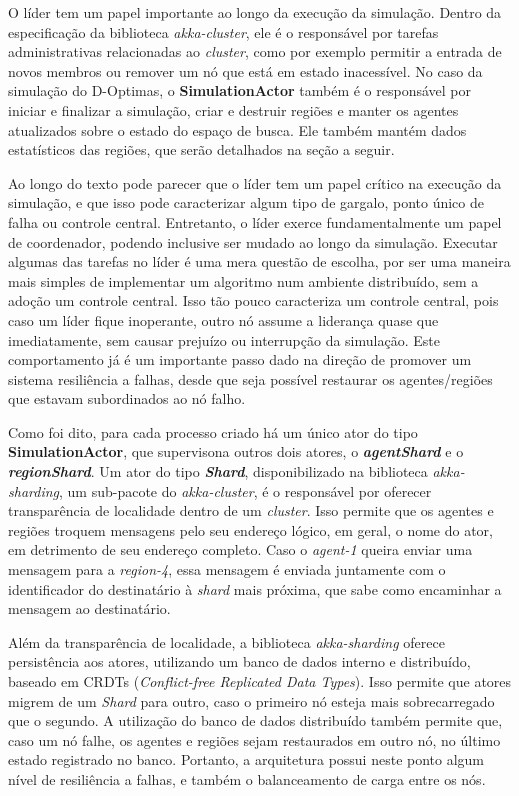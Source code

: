  O líder tem um papel importante ao longo da execução da simulação. Dentro da especificação da biblioteca \textit{akka-cluster}, ele é o responsável por tarefas administrativas relacionadas ao \textit{cluster}, como por exemplo permitir a entrada de novos membros ou remover um nó que está em estado inacessível. No caso da simulação do D-Optimas, o \textbf{SimulationActor} também é o responsável por iniciar e finalizar a simulação, criar e destruir regiões e manter os agentes atualizados sobre o estado do espaço de busca. Ele também mantém dados estatísticos das regiões, que serão detalhados na seção a seguir. 
 
Ao longo do texto pode parecer que o líder tem um papel crítico na execução da simulação, e que isso pode caracterizar algum tipo de gargalo, ponto único de falha ou controle central. Entretanto, o líder exerce fundamentalmente um papel de coordenador, podendo inclusive ser mudado ao longo da simulação. Executar algumas das tarefas no líder é uma mera questão de escolha, por ser uma maneira mais simples de implementar um algoritmo num ambiente distribuído, sem a adoção um controle central. Isso tão pouco caracteriza um controle central, pois caso um líder fique inoperante, outro nó assume a liderança quase que imediatamente, sem causar prejuízo ou interrupção da simulação. Este comportamento já é um importante passo dado na direção de promover um sistema resiliência a falhas, desde  que seja possível restaurar os agentes/regiões que estavam subordinados ao nó falho. 
 
 Como foi dito, para cada processo criado há um único ator do tipo \textbf{SimulationActor}, que supervisona outros dois atores, o \textit{\textbf{agentShard}} e o \textit{\textbf{regionShard}}. Um ator do tipo \textit{\textbf{Shard}}, disponibilizado na biblioteca \textit{akka-sharding}, um sub-pacote do \textit{akka-cluster}, é o responsável por oferecer transparência de localidade dentro de um \textit{cluster}. Isso permite que os agentes e regiões  troquem mensagens pelo seu endereço lógico, em geral, o nome do ator, em detrimento de seu endereço completo. Caso o \textit{agent-1} queira enviar uma mensagem para a \textit{region-4}, essa mensagem é enviada juntamente com o identificador do destinatário à \textit{shard} mais próxima, que sabe como encaminhar a mensagem ao destinatário. 
 
 Além da transparência de localidade, a biblioteca \textit{akka-sharding} oferece persistência aos atores, utilizando um banco de dados interno e distribuído, baseado em CRDTs (\textit{Conflict-free Replicated Data Types})\cite{shapiro2011}. Isso permite que atores migrem de um \textit{Shard} para outro, caso o primeiro nó esteja mais sobrecarregado que o segundo. A utilização do banco de dados distribuído também permite que, caso um nó falhe, os agentes e regiões sejam restaurados em outro nó, no último estado registrado no banco. Portanto, a arquitetura possui neste ponto algum nível de resiliência a falhas, e também o balanceamento de carga entre os nós. 
 

